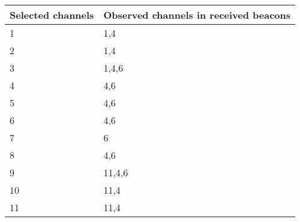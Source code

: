 \begin{tabular}{l | l}
Selected channels & Observed channels in received beacons \\ \hline
1 & 1,4\\ \hline
2 & 1,4\\ \hline
3 & 1,4,6\\ \hline
4 & 4,6\\ \hline
5 & 4,6\\ \hline
6 & 4,6\\ \hline
7 & 6\\ \hline
8 & 4,6\\ \hline
9 & 11,4,6\\ \hline
10 & 11,4\\ \hline
11 & 11,4\\
\end{tabular}
